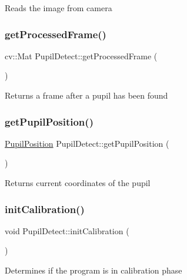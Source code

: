 Reads the image from camera \mbox{\label{class_pupil_detect_af770df91c51d99bdd1a282e8b9fb6f1b}} 
\subsubsection{\texorpdfstring{get\+Processed\+Frame()}{getProcessedFrame()}}
{\footnotesize\ttfamily cv\+::\+Mat Pupil\+Detect\+::get\+Processed\+Frame (\begin{DoxyParamCaption}{ }\end{DoxyParamCaption})}

Returns a frame after a pupil has been found \mbox{\label{class_pupil_detect_a95abbcaf36e31ea938ffdbc3402a481a}} 
\subsubsection{\texorpdfstring{get\+Pupil\+Position()}{getPupilPosition()}}
{\footnotesize\ttfamily \mbox{\hyperlink{struct_pupil_position}{Pupil\+Position}} Pupil\+Detect\+::get\+Pupil\+Position (\begin{DoxyParamCaption}{ }\end{DoxyParamCaption})}

Returns current coordinates of the pupil \mbox{\label{class_pupil_detect_aef0256a07774377932e949f2ba460fde}} 
\subsubsection{\texorpdfstring{init\+Calibration()}{initCalibration()}}
{\footnotesize\ttfamily void Pupil\+Detect\+::init\+Calibration (\begin{DoxyParamCaption}{ }\end{DoxyParamCaption})}

Determines if the program is in calibration phase \mbox{\label{class_pupil_detect_a22dc3e6f1496e1f0a79c61433f062cf0}} 
